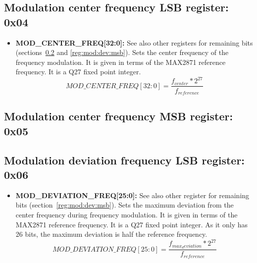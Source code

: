 \documentclass{article}
\newcommand{\bitrect}[2]{
  \begin{pgfonlayer}{foreground}
    \draw [thick] (0,0) rectangle (#1,1);
    \pgfmathsetmacro\result{#1-1}
    \foreach \x in {1,...,\result}
      \draw [thick] (\x,1) -- (\x, 0.8);
  \end{pgfonlayer}
  \bitlabels{#1}{#2}
}
\newcommand{\rwbits}[3]{
  \draw [thick] (#1,0) rectangle ++(#2,1) node[pos=0.5]{#3};
  \pgfmathsetmacro\start{#1+0.5}
  \pgfmathsetmacro\finish{#1+#2-0.5}
}
\newcommand{\bitlabels}[2]{
  \foreach \bit in {1,...,#1}{
     \pgfmathsetmacro\result{#2}
     \node [above] at (\bit-0.5, 1) {\pgfmathprintnumber{\result}};
   }
}
\begin{document}
\subsection{Modulation center frequency LSB register: 0x04}
\label{reg:mod:center:lsb}
\begin{center}
\end{center}
\begin{itemize}
\item \textbf{MOD\_CENTER\_FREQ[32:0]:} See also other registers for remaining bits (sections~\ref{reg:mod:center:msb} and \ref{reg:mod:dev:msb}). Sets the center frequency of the frequency modulation. It is given in terms of the MAX2871 reference frequency. It is a Q27 fixed point integer.
$$
MOD\_CENTER\_FREQ[32:0] = \frac{f_{center} * 2^{27}}{f_{reference}}
$$
\end{itemize}

\subsection{Modulation center frequency MSB register: 0x05}
\label{reg:mod:center:msb}
\begin{center}
\end{center}

\subsection{Modulation deviation frequency LSB register: 0x06}
\label{reg:mod:dev:lsb}
\begin{center}
\end{center}

\begin{itemize}
\item \textbf{MOD\_DEVIATION\_FREQ[25:0]:} See also other register for remaining bits (section~\ref{reg:mod:dev:msb}). Sets the maximum deviation from the center frequency during frequency modulation. It is given in terms of the MAX2871 reference frequency. It is a Q27 fixed point integer. As it only has 26 bits, the maximum deviation is half the reference frequency.
$$
MOD\_DEVIATION\_FREQ[25:0] = \frac{f_{max_deviation} * 2^{27}}{f_{reference}}
$$
\end{itemize}
\end{document}
